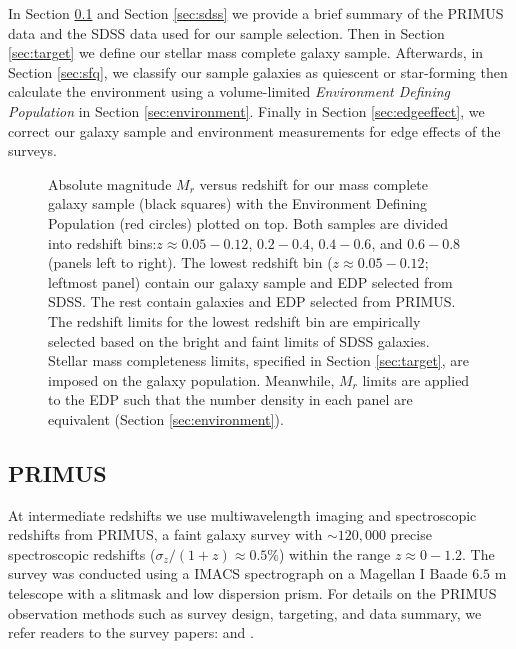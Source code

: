 \documentclass{emulateapj}
\begin{document}
In Section \ref{sec:primus} and Section \ref{sec:sdss} we provide a brief summary of the PRIMUS data and the SDSS data used for our sample selection. Then in Section \ref{sec:target} we define our stellar mass complete galaxy sample. Afterwards, in Section \ref{sec:sfq}, we classify our sample galaxies as quiescent or star-forming then calculate the environment using a volume-limited {\em Environment Defining Population} in Section \ref{sec:environment}. 
Finally in Section \ref{sec:edgeeffect}, we correct our galaxy sample and environment measurements for edge effects of the surveys. 

\begin{figure*}
    \begin{center}
        \leavevmode
        \caption{Absolute magnitude $M_{r}$ versus redshift for our mass complete galaxy sample (black squares) with the Environment Defining Population (red circles) plotted on top. Both samples are divided into redshift bins:$z \approx 0.05-0.12$, $0.2-0.4$, $0.4-0.6$, and $0.6-0.8$ (panels left to right). The lowest redshift bin ($z \approx 0.05-0.12$; leftmost panel) contain our galaxy sample and EDP selected from SDSS. The rest contain galaxies and EDP selected from PRIMUS. The redshift limits for the lowest redshift bin are empirically selected based on the bright and faint limits of SDSS galaxies. Stellar mass completeness limits, specified in Section \ref{sec:target}, are imposed on the galaxy population. Meanwhile, $M_{r}$ limits are applied to the EDP such that the number density in each panel are equivalent (Section \ref{sec:environment}).} \label{fig:targetEDP}
    \end{center}
\end{figure*}
\subsection{PRIMUS} \label{sec:primus}
At intermediate redshifts we use multiwavelength imaging and spectroscopic redshifts from PRIMUS, a faint galaxy survey with $\sim 120,000$ precise spectroscopic redshifts ($\sigma_z/(1+z) \approx 0.5 \%$) within the range $z \approx 0-1.2$. The survey was conducted using a IMACS spectrograph on a Magellan I Baade $6.5$ m telescope with a slitmask and low dispersion prism. For details on the PRIMUS observation methods such as survey design, targeting, and data summary, we refer readers to the survey papers: \cite{Coil:2011aa} and \cite{Cool:2013aa}. 
\end{document}
